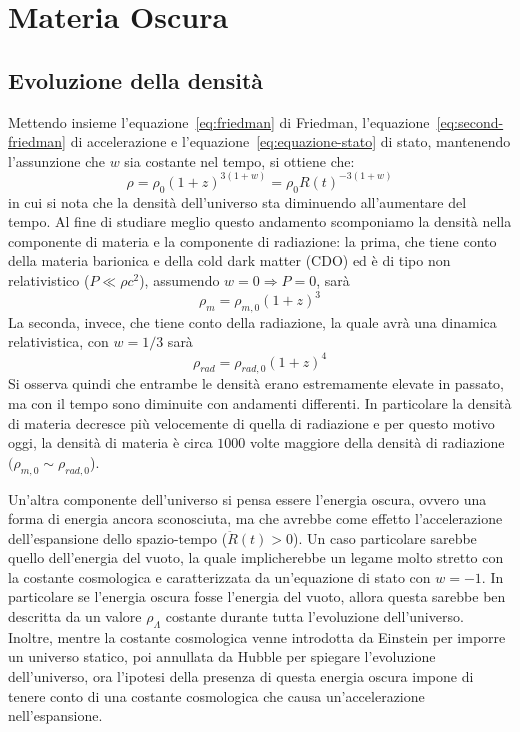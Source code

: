 \section{Materia Oscura}\label{sec:materia-oscura}
\subsection{Evoluzione della densità}\label{sec:evoluazione-densita}
Mettendo insieme l'equazione~\eqref{eq:friedman} di Friedman, l'equazione~\eqref{eq:second-friedman} di accelerazione e l'equazione~\eqref{eq:equazione-stato} di stato, mantenendo l'assunzione che $w$ sia costante nel tempo, si ottiene che:
\[
    \rho = \rho_0 {(1+z)}^{3(1+w)} = \rho_0 {R(t)}^{-3(1+w)}
\]
in cui si nota che la densità dell'universo sta diminuendo all'aumentare del tempo. Al fine di studiare meglio questo andamento scomponiamo la densità nella componente di materia e la componente di radiazione: la prima, che tiene conto della materia barionica e della cold dark matter (CDO) ed è di tipo non relativistico ($P \ll \rho c^2$), assumendo $w = 0 \Rightarrow P=0$, sarà
\[
    \rho_{m} = \rho_{m,0}{(1+z)}^3
\]
La seconda, invece, che tiene conto della radiazione, la quale avrà una dinamica relativistica, con $w = 1/3$ sarà
\[
    \rho_{rad} = \rho_{rad,0}{(1+z)}^4
\]
Si osserva quindi che entrambe le densità erano estremamente elevate in passato, ma con il tempo sono diminuite con andamenti differenti. In particolare la densità di materia decresce più velocemente di quella di radiazione e per questo motivo oggi, la densità di materia è circa $1000$ volte maggiore della densità di radiazione $(\rho_{m,0} \sim \rho_{rad,0}$).

Un'altra componente dell'universo si pensa essere l'energia oscura, ovvero una forma di energia ancora sconosciuta, ma che avrebbe come effetto l'accelerazione dell'espansione dello spazio-tempo ($\ddot{R}(t)>0$). Un caso particolare sarebbe quello dell'energia del vuoto, la quale implicherebbe un legame molto stretto con la costante cosmologica e caratterizzata da un'equazione di stato con $w = -1$. In particolare se l'energia oscura fosse l'energia del vuoto, allora questa sarebbe ben descritta da un valore $\rho_{\Lambda}$ costante durante tutta l'evoluzione dell'universo. Inoltre, mentre la costante cosmologica venne introdotta da Einstein per imporre un universo statico, poi annullata da Hubble per spiegare l'evoluzione dell'universo, ora l'ipotesi della presenza di questa energia oscura impone di tenere conto di una costante cosmologica che causa un'accelerazione nell'espansione.

